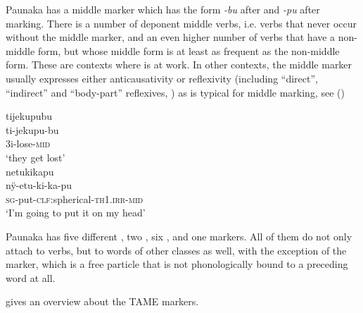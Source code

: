 Paunaka has a middle marker which has the form \textit{-bu} after  and \textit{-pu} after  marking. There is a number of deponent middle verbs, i.e. verbs that never occur without the middle marker, and an even higher number of verbs that have a non-middle form, but whose middle form is at least as frequent as the non-middle form. These are contexts where  is at work. In other contexts, the middle marker usually expresses either anticausativity or reflexivity (including “direct”, “indirect” and “body-part” reflexives, \citealp[cf.][]{Kemmer1993}) as is typical for middle marking, see ()

\ea\label{ex:Sketch-Middle}
  \ea
\begingl
\glpreamble tijekupubu\\
\gla ti-jekupu-bu\\
\glb 3i-lose-\textsc{mid}\\
\glft ‘they get lost’\\
\endgl
  \ex
\begingl
\glpreamble netukikapu\\
\gla nÿ-etu-ki-ka-pu\\
\textsc{sg}-put-\textsc{clf:}spherical-\textsc{th}1.\textsc{irr}-\textsc{mid}\\
\glft ‘I'm going to put it on my head’\\
\endgl
\z
\xe
{}

Paunaka has five different , two , six , and one  markers. All of them do not only attach to verbs, but to words of other classes as well, with the exception of the  marker, which is a free particle that is not phonologically bound to a preceding word at all.

 gives an overview about the TAME markers.

